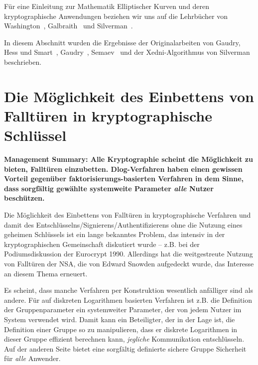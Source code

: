 \begin{refsegment}
Für eine Einleitung zur Mathematik Elliptischer Kurven und deren kryptographische Anwendungen beziehen wir uns auf die Lehrbücher von Washington~\cite{Washington2008}, Galbraith~\cite{Galbraith2012} und Silverman~\cite{Silverman1999}.

In diesem Abschnitt wurden die Ergebnisse der Originalarbeiten von Gaudry, Hess und Smart~\cite{GHS2002}, Gaudry~\cite{Gaudry2009}, Semaev~\cite{Semaev2004} und der Xedni-Algorithmus von Silverman~\cite{Silverman1999} beschrieben.



\newpage
\section{Die Möglichkeit des Einbettens von Falltüren in kryptographische Schlüssel}

{\bf Management Summary: Alle Kryptographie scheint die Möglichkeit zu bieten, Falltüren einzubetten. Dlog-Verfahren haben einen gewissen Vorteil gegenüber faktorisierungs-basierten Verfahren in dem Sinne, dass sorgfältig gewählte systemweite Parameter {\em alle} Nutzer beschützen.\\[0.1cm]}

Die Möglichkeit des Einbettens von Falltüren in kryptographische Verfahren und damit des Entschlüsselns/Signierens/Authentifizierens ohne die Nutzung eines geheimen Schlüssels ist ein lange bekanntes Problem, das intensiv in der kryptographischen Gemeinschaft diskutiert wurde -- z.B. bei der Podiumsdiskussion der Eurocrypt 1990.
Allerdings hat die weitgestreute Nutzung von Falltüren der NSA, die von Edward Snowden aufgedeckt wurde, das Interesse an diesem Thema erneuert.

Es scheint, dass manche Verfahren per Konstruktion wesentlich anfälliger sind als andere. Für auf diskreten Logarithmen basierten Verfahren ist z.B. die Definition der Gruppenparameter ein systemweiter Parameter, der von jedem Nutzer im System verwendet wird. Damit kann ein Beteiligter, der in der Lage ist, die Definition einer Gruppe so zu manipulieren, dass er diskrete Logarithmen in dieser Gruppe effizient berechnen kann, {\em jegliche} Kommunikation entschlüsseln. Auf der anderen Seite bietet eine sorgfältig definierte sichere Gruppe Sicherheit für {\em alle} Anwender.


\end{refsegment}
